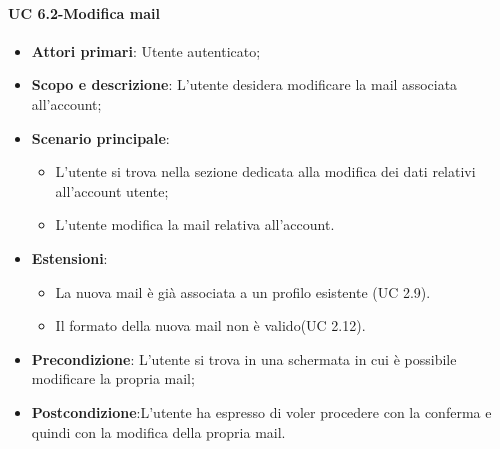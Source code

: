         
        \paragraph{UC 6.2-Modifica mail}
            \begin{itemize}
                \item \textbf{Attori primari}: Utente autenticato;
               
                \item \textbf{Scopo e descrizione}: L'utente desidera modificare la mail associata all'account; 
                \item \textbf{Scenario principale}:
                    \begin{itemize}
                        \item L'utente si trova nella sezione dedicata alla modifica dei dati relativi all'account utente;
                        \item L'utente modifica la mail relativa all'account.
                    \end{itemize}
                \item \textbf{Estensioni}:
                    \begin{itemize}
                        \item La nuova mail è già associata a un profilo esistente (UC 2.9).
                        \item Il formato della nuova mail non è valido(UC 2.12).
                      \end{itemize}
                \item \textbf{Precondizione}: L'utente si trova in una schermata in cui è possibile modificare la propria mail;
                \item \textbf{Postcondizione}:L’utente ha espresso di voler procedere con la conferma e quindi
                con la modifica della propria mail.
            \end{itemize}
        
